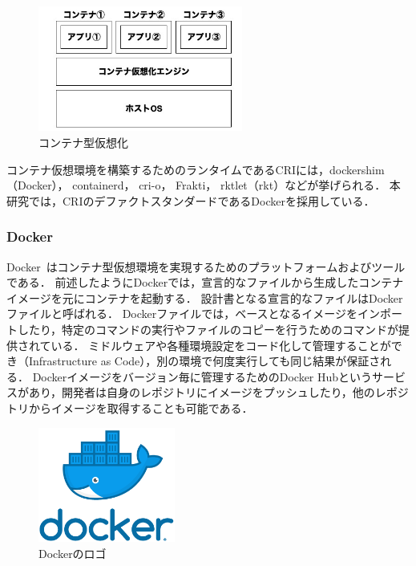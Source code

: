 \begin{figure}[htbp]
\begin{center}
    \includegraphics[width=0.6\textwidth]{./figures/docker-structure.jpg}
    \caption{コンテナ型仮想化}
\end{center}
\end{figure}

コンテナ仮想環境を構築するためのランタイムであるCRIには，dockershim（Docker）， containerd， cri-o， Frakti， rktlet（rkt）などが挙げられる．
本研究では，CRIのデファクトスタンダードであるDockerを採用している．

\subsubsection{Docker}
\label{background:container-orchestration-system:container:docker}

Docker~\cite{Docker}はコンテナ型仮想環境を実現するためのプラットフォームおよびツールである．
前述したようにDockerでは，宣言的なファイルから生成したコンテナイメージを元にコンテナを起動する．
設計書となる宣言的なファイルはDockerファイルと呼ばれる．
Dockerファイルでは，ベースとなるイメージをインポートしたり，特定のコマンドの実行やファイルのコピーを行うためのコマンドが提供されている．
ミドルウェアや各種環境設定をコード化して管理することができ（Infrastructure as Code），別の環境で何度実行しても同じ結果が保証される．
Dockerイメージをバージョン毎に管理するためのDocker Hubというサービスがあり，開発者は自身のレポジトリにイメージをプッシュしたり，他のレポジトリからイメージを取得することも可能である．

\begin{figure}[htbp]
\begin{center}
    \includegraphics[width=0.4\textwidth]{./figures/docker-logo.png}
    \caption{Dockerのロゴ}
\end{center}
\end{figure}

